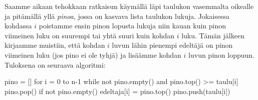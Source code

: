 Saamme aikaan tehokkaan ratkaisun käymällä läpi taulukon
vasemmalta oikealle ja pitämällä yllä \emph{pinoa}, jossa on
kasvava lista taulukon lukuja.
Jokaisessa kohdassa $i$ poistamme ensin pinon lopusta lukuja
niin kauan kuin pinon viimeinen luku on suurempi tai yhtä
suuri kuin kohdan $i$ luku.
Tämän jälkeen kirjaamme muistiin, että kohdan $i$ luvun
lähin pienempi edeltäjä on pinon viimeinen luku (jos pino ei ole tyhjä) ja
lisäämme kohdan $i$ luvun pinon loppuun.
Tuloksena on seuraava algoritmi:

\begin{code}
pino = []
for i = 0 to n-1
    while not pino.empty() and pino.top() >= taulu[i]
        pino.pop()
    if not pino.empty()
        edeltaja[i] = pino.top()
    pino.push(taulu[i])
\end{code}

